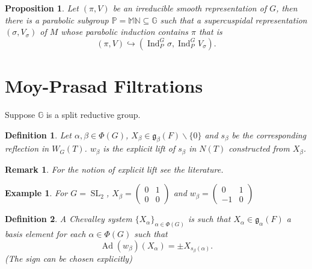 \documentclass[10pt]{article}
\newtheorem{proposition}{Proposition}[section]
\newtheorem{definition}{Definition}[section]
\newtheorem{remark}{Remark}[section]
\newtheorem{example}{Example}[section]
\numberwithin{equation}{theorem}
\DeclareMathOperator{\Ind}{Ind}
\DeclareMathOperator{\SL}{SL}
\DeclareMathOperator{\Ad}{Ad}
\newcommand{\g}[0]{\mathfrak{g}}
\begin{document}
\begin{proposition}
    \label{proposition_3_2}
    Let $(\pi,V)$ be an irreducible smooth representation of $G$, then there is a parabolic subgroup $\mathbb{P}=\mathbb{M}\mathbb{N}\subseteq \mathbb{G}$ such that a supercuspidal representation $(\sigma,V_\sigma)$ of $M$ whose parabolic induction contains $\pi$ that is 
    \begin{equation*}
        (\pi,V)\hookrightarrow (\Ind_P^G\sigma,\Ind_P^G V_\sigma).
    \end{equation*}
\end{proposition}

\section{Moy-Prasad Filtrations}

Suppose $\mathbb{G}$ is a split reductive group. 

\begin{definition}
    Let $\alpha,\beta\in\Phi(G)$, $X_\beta\in \g_\beta(F)\backslash\{0\}$ and $s_\beta$ be the corresponding reflection in $W_G(T)$. $w_\beta$ is the explicit lift of $s_\beta$ in $N(T)$ constructed from $X_\beta$.
\end{definition}

\begin{remark}
    For the notion of explicit lift see the literature.
\end{remark}

\begin{example}
    For $G=\SL_2$, $X_\beta = \begin{pmatrix}
        0&1\\0&0
    \end{pmatrix}$ and $w_\beta = \begin{pmatrix}
        0 & 1\\ -1&0
    \end{pmatrix}$
\end{example}

\begin{definition}
    A Chevalley system $\{X_\alpha\}_{\alpha\in\Phi(G)}$ is such that $X_\alpha\in\g_\alpha(F)$ a basis element for each $\alpha\in\Phi(G)$ such that 
    \begin{equation*}
        \Ad(w_\beta)(X_\alpha) = \pm X_{s_\beta(\alpha)}.
    \end{equation*}
    (The sign can be chosen explicitly)
\end{definition}
\end{document}
